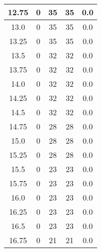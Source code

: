\documentclass[letterpaper, 12pt]{article}
\begin{document}
\begin{longtable}{|c|c|c|c|c|}
\hline
12.75 & 0 & 35 & 35 & 0.0 \\
\hline
13.0 & 0 & 35 & 35 & 0.0 \\
\hline
13.25 & 0 & 35 & 35 & 0.0 \\
\hline
13.5 & 0 & 32 & 32 & 0.0 \\
\hline
13.75 & 0 & 32 & 32 & 0.0 \\
\hline
14.0 & 0 & 32 & 32 & 0.0 \\
\hline
14.25 & 0 & 32 & 32 & 0.0 \\
\hline
14.5 & 0 & 32 & 32 & 0.0 \\
\hline
14.75 & 0 & 28 & 28 & 0.0 \\
\hline
15.0 & 0 & 28 & 28 & 0.0 \\
\hline
15.25 & 0 & 28 & 28 & 0.0 \\
\hline
15.5 & 0 & 23 & 23 & 0.0 \\
\hline
15.75 & 0 & 23 & 23 & 0.0 \\
\hline
16.0 & 0 & 23 & 23 & 0.0 \\
\hline
16.25 & 0 & 23 & 23 & 0.0 \\
\hline
16.5 & 0 & 23 & 23 & 0.0 \\
\hline
16.75 & 0 & 21 & 21 & 0.0 \\
\hline
\end{longtable}
\end{document}
